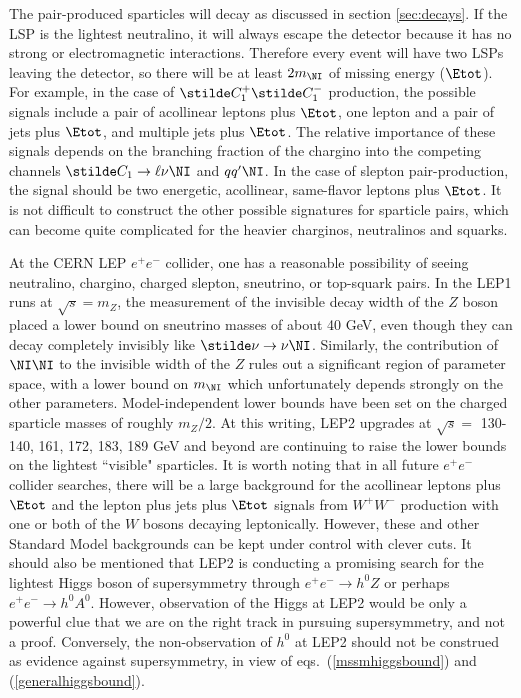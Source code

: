 The pair-produced sparticles will decay as discussed in section
\ref{sec:decays}.
If the LSP is the lightest neutralino, it will always escape the
detector because it has no strong or electromagnetic interactions.
Therefore every event will have two LSPs leaving the detector,
so there will be at least $2m_{\NI}$ of missing energy ($\Etot$).
For example, in the case of $\stilde C_1^+ \stilde C_1^-$ production, the
possible signals
include a pair of acollinear leptons plus $\Etot$,
one lepton and a pair of jets plus $\Etot$, and multiple jets
plus $\Etot$.
The relative importance of these signals depends on the branching fraction
of the chargino into the competing channels $\stilde C_1 \rightarrow
\ell\nu \NI$ and $qq^\prime\NI$. In the case of slepton pair-production,
the signal should be two energetic, acollinear, same-flavor leptons plus
$\Etot$.
It is not difficult to construct the other possible signatures
for sparticle pairs, which can become quite complicated for the
heavier charginos, neutralinos and squarks.

At the CERN LEP $e^+e^-$ collider, one has a reasonable possibility
of seeing neutralino, chargino, charged slepton, sneutrino, or top-squark
pairs. In the LEP1 runs at $\sqrt{s} = m_Z$,
the measurement of the invisible decay width of the $Z$ boson placed
a lower bound on sneutrino masses of about 40 GeV,
even though they can decay completely invisibly like
$\stilde \nu \rightarrow \nu\NI$. Similarly, the contribution
of $\NI\NI$ to the invisible width of the $Z$ rules out a significant
region of parameter space, with a lower bound on
$m_{\NI}$ which unfortunately depends strongly on the other parameters.
Model-independent lower bounds
have been set on the charged sparticle masses of roughly $m_Z/2$.
At this writing, LEP2 upgrades at $\sqrt{s} =$ 130-140, 161, 172, 183, 189 
GeV
and beyond are continuing to raise the lower bounds on the lightest
``visible" sparticles.
It is worth noting that in all future $e^+e^-$ collider
searches, there
will be a
large background for
the acollinear leptons plus $\Etot$ and the lepton plus jets
plus $\Etot$ signals from $W^+W^-$ production with one or both
of the $W$ bosons decaying leptonically. However,
these and other Standard Model backgrounds
can be kept under control with clever cuts.
It should also be mentioned that LEP2 is 
conducting a promising search for the lightest Higgs boson of
supersymmetry
through $e^+e^-\rightarrow h^0Z$ or perhaps $e^+e^-\rightarrow h^0A^0$.
However, observation
of the Higgs at LEP2 would be only a powerful clue that we are on the
right track in pursuing supersymmetry, and not a proof. Conversely,
the non-observation of $h^0$ at LEP2 should not be construed as
evidence against supersymmetry, in view of
eqs.~(\ref{mssmhiggsbound}) and (\ref{generalhiggsbound}).

